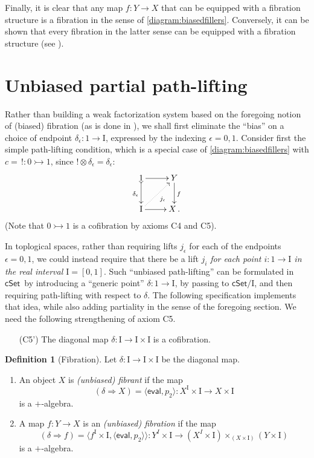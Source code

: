 \documentclass[11pt]{article}
\newcommand{\cSet}{\ensuremath{\mathsf{cSet}}}
\newcommand{\mono}{\ensuremath{\rightarrowtail}}
\newcommand{\I}{\ensuremath{\mathrm{I}}}
\theoremstyle{remark}
\theoremstyle{definition}
\newtheorem{definition}[theorem]{Definition}
\begin{document}
Finally, it is clear that any map $f: Y\to X$  that can be equipped with a fibration structure is a fibration in the sense of \eqref{diagram:biasedfillers}.  Conversely, it can be shown that every fibration in the latter sense can be equipped with a fibration structure (see \cite{GS}).  

\section{Unbiased partial path-lifting}


Rather than building a weak factorization system based on the foregoing notion of (biased) fibration (as is done in \cite{GG,OP}), we shall first eliminate the ``bias'' on a choice of endpoint $\delta_\epsilon : 1 \to \I$, expressed by the indexing $\epsilon = 0,1$.  Consider first the simple path-lifting condition, which is a special case of \eqref{diagram:biasedfillers} with $c =\, ! : 0\mono 1$, since $!\otimes\delta_\epsilon = \delta_\epsilon$:
\begin{equation*}
\xymatrix{
1 \ar@{>->}[d]_{\delta_\epsilon} \ar[r] & Y \ar[d]^f \\
\I \ar@{.>}[ru]_{j_\epsilon} \ar[r] & X\,.
}
\end{equation*}
(Note that $0\mono 1$ is a cofibration by axioms C4 and C5).

In toplogical spaces, rather than requiring lifts $j_\epsilon$ for each of the endpoints $\epsilon = 0,1$, we could instead require that there be a lift $j_i$ \emph{for each point $i: 1\to\I$ in the real interval $\I = [0,1]$}. Such ``unbiased path-lifting'' can be formulated in \cSet\ by introducing a ``generic point'' $\delta : 1\to \I$, by passing to $\cSet/\I$, and then requiring path-lifting with respect to $\delta$.  The following specification implements that  idea, while also adding partiality in the sense of the foregoing section.  We need the following strengthening of axiom C5.

\begin{enumerate}
\item[(C5')] The diagonal map $\delta : \I\to\I\times\I$ is a cofibration.  
\end{enumerate}

\begin{definition}[Fibration] Let $\delta : \I\to\I\times\I$ be the diagonal map.
\begin{enumerate}
\item An object $X$ is \emph{(unbiased) fibrant} if the map 
\[
(\delta\Rightarrow\! X) = \langle\mathsf{eval}, p_2\rangle : X^\I \times \I \to X\times \I
\]
is a $+$-algebra. 
\item A map $f : Y\to X$ is an \emph{(unbiased) fibration} if the map 
\[
(\delta\Rightarrow\! f) = \langle f^\I\times \I, \langle \mathsf{eval},p_2 \rangle\rangle: Y^I\times \I \to (X^I \times \I)\times_{(X\times \I)} (Y\times\I)
\]
is a $+$-algebra.
\end{enumerate}
\end{definition}
\end{document}
